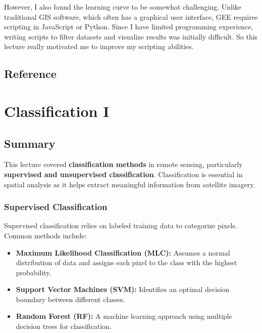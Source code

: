 \documentclass[
  letterpaper,
]{scrbook}
\begin{document}
However, I also found the learning curve to be somewhat challenging.
Unlike traditional GIS software, which often has a graphical user
interface, GEE requires scripting in JavaScript or Python. Since I have
limited programming experience, writing scripts to filter datasets and
visualize results was initially difficult. So this lecture really
motivated me to improve my scripting abilities.

\section{Reference}\label{reference-3}


\chapter{Classification I}\label{classification-i}

\section{Summary}\label{summary-4}

This lecture covered \textbf{classification methods} in remote sensing,
particularly \textbf{supervised and unsupervised classification}.
Classification is essential in spatial analysis as it helps extract
meaningful information from satellite imagery.

\subsection{\texorpdfstring{\textbf{Supervised
Classification}}{Supervised Classification}}\label{supervised-classification}

Supervised classification relies on labeled training data to categorize
pixels. Common methods include:

\begin{itemize}
\item
  \textbf{Maximum Likelihood Classification (MLC):} Assumes a normal
  distribution of data and assigns each pixel to the class with the
  highest probability.
\item
  \textbf{Support Vector Machines (SVM):} Identifies an optimal decision
  boundary between different classes.
\item
  \textbf{Random Forest (RF):} A machine learning approach using
  multiple decision trees for classification.
\end{itemize}
\end{document}

